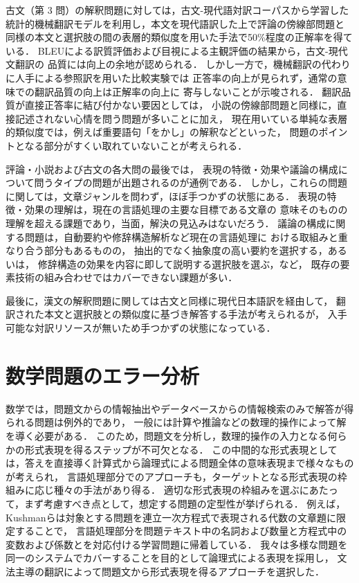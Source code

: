 \documentclass[japanese]{jnlp_1.4b}
\begin{document}
古文（第 3 問）の解釈問題に対しては，古文-現代語対訳コーパスから学習した
統計的機械翻訳モデルを利用し，本文を現代語訳した上で評論の傍線部問題と
同様の本文と選択肢の間の表層的類似度を用いた手法で50\%程度の正解率を得ている．
BLEUによる訳質評価および目視による主観評価の結果から，古文-現代文翻訳の
品質には向上の余地が認められる．
しかし一方で，機械翻訳の代わりに人手による参照訳を用いた比較実験では
正答率の向上が見られず，通常の意味での翻訳品質の向上は正解率の向上に
寄与しないことが示唆される．
翻訳品質が直接正答率に結び付かない要因としては，
小説の傍線部問題と同様に，直接記述されない心情を問う問題が多いことに加え，
現在用いている単純な表層的類似度では，例えば重要語句「をかし」の解釈などといった，
問題のポイントとなる部分がすくい取れていないことが考えられる．

評論・小説および古文の各大問の最後では，
表現の特徴・効果や議論の構成について問うタイプの問題が出題されるのが通例である．
しかし，これらの問題に関しては，文章ジャンルを問わず，ほぼ手つかずの状態にある．
表現の特徴・効果の理解は，現在の言語処理の主要な目標である文章の
意味そのものの理解を超える課題であり，当面，解決の見込みはないだろう．
議論の構成に関する問題は，自動要約や修辞構造解析など現在の言語処理に
おける取組みと重なり合う部分もあるものの，
抽出的でなく抽象度の高い要約を選択する，あるいは，
修辞構造の効果を内容に即して説明する選択肢を選ぶ，など，
既存の要素技術の組み合わせではカバーできない課題が多い．

最後に，漢文の解釈問題に関しては古文と同様に現代日本語訳を経由して，
翻訳された本文と選択肢との類似度に基づき解答する手法が考えられるが，
入手可能な対訳リソースが無いため手つかずの状態になっている．


\def\typename#1{}

\section{数学問題のエラー分析}
\label{sec:suugaku}

数学では，問題文からの情報抽出やデータベースからの情報検索のみで解答が得られる問題は例外的であり，
一般には計算や推論などの数理的操作によって解を導く必要がある．
このため，問題文を分析し，数理的操作の入力となる何らかの形式表現を得るステップが不可欠となる．
この中間的な形式表現としては，答えを直接導く計算式から論理式による問題全体の意味表現まで様々なものが考えられ，
言語処理部分でのアプローチも，ターゲットとなる形式表現の枠組みに応じ種々の手法があり得る．
適切な形式表現の枠組みを選ぶにあたって，まず考慮すべき点として，想定する問題の定型性が挙げられる．
例えば，Kushmanら\cite{Kushman2014}は対象とする問題を連立一次方程式で表現される代数の文章題に限定することで，
言語処理部分を問題テキスト中の名詞および数量と方程式中の変数および係数とを対応付ける学習問題に帰着している．
我々は多様な問題を同一のシステムでカバーすることを目的として論理式による表現を採用し，
文法主導の翻訳によって問題文から形式表現を得るアプローチを選択した．
\end{document}
